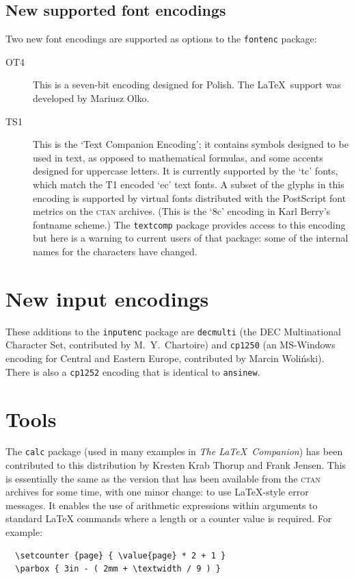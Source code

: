 \documentclass{ltnews}
\providecommand\pkg[1]{\texttt{#1}}
\providecommand\option[1]{\texttt{#1}}
\begin{document}
\maketitle

\subsection{New supported font encodings}

Two new font encodings are supported as options to the \pkg{fontenc}
package:
\begin{description}
\item [OT4]
This is a seven-bit encoding designed for Polish. The \LaTeX\ support
was developed by Mariusz Olko.
\item [TS1] This is the `Text Companion Encoding'; it contains symbols
designed to be used in text, as opposed to mathematical formulas, and
some accents designed for uppercase letters.  It is currently
supported by the `tc' fonts, which match the T1 encoded `ec' text
fonts.  A subset of the glyphs in this encoding is supported by
virtual fonts distributed with the PostScript font metrics on the
\textsc{ctan} archives. (This is the `8c' encoding in Karl Berry's
fontname scheme.)  The \pkg{textcomp} package provides access to
this encoding but here is a warning to current users of that package:
some of the internal names for the characters have changed.
\end{description}


\section{New input encodings}

These additions to the \pkg{inputenc} package are
\option{decmulti} (the DEC Multinational
Character Set,  contributed by M.~Y.~Chartoire)
and \option{cp1250} (an MS-Windows encoding for Central and Eastern
Europe, contributed by Marcin Woli\'nski).  There is also a
\option{cp1252} encoding that is identical to \option{ansinew}.


\section{Tools}

The \pkg{calc} package (used in many examples in \emph{The \LaTeX\
Companion}) has been contributed to this distribution by Kresten Krab
Thorup and Frank Jensen. This is essentially the same as the version
that has been available from the \textsc{ctan} archives for some time,
with one minor change: to use \LaTeX-style error messages.  It enables
the use of arithmetic expressions within arguments to standard
\LaTeX{} commands where a length or a counter value is required.  For
example:
\begin{verbatim}
  \setcounter {page} { \value{page} * 2 + 1 }
  \parbox { 3in - ( 2mm + \textwidth / 9 ) }
\end{verbatim}
\end{document}
